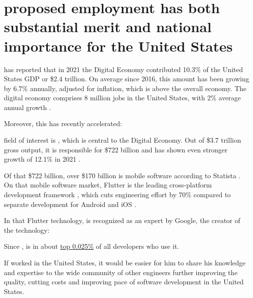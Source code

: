 \section{%
    \mrls proposed employment has both substantial merit and national importance for the United States%
}
\label{sec:Benefit}

\Bea has reported that in 2021 the Digital Economy contributed
10.3\% of the United States GDP or \$2.4 trillion.
On average since 2016, this amount has been growing
by 6.7\% annually, adjusted for inflation, which is above the overall economy.
The digital economy comprises 8 million jobs in the United States,
with 2\% average annual growth .

Moreover, this has recently accelerated:


\mrls field of interest is \fie, which is central to the Digital Economy.
Out of \$3.7 trillion gross output, it is responsible for \$722 billion
and has shown even stronger growth of 12.1\% in 2021 .

Of that \$722 billion, over \$170 billion is mobile software according to Statista .
On that mobile software market, Flutter is the leading cross-platform development framework ,
which cuts engineering effort by 70\% compared to separate development for Android and iOS .

In that Flutter technology, \mrl is recognized as an expert by Google, the creator of the technology:


Since ,
\mrl is in about \ul{top 0.025\%} of all developers who use it.

If \mrl worked in the United States, it would be easier for him to share his knowledge and expertise
to the wide community of other engineers further improving the quality, cutting costs and improving
pace of software development in the United States.

